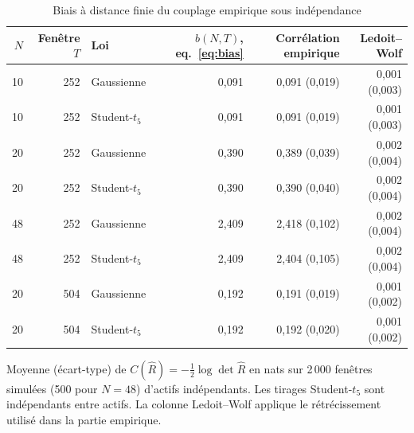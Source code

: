 \begin{table}[p]\centering\small
\caption{Biais à distance finie du couplage empirique sous indépendance}\label{tab:bias}
\begin{tabular}{@{}rrlrrr@{}}\toprule
$N$ & Fenêtre $T$ & Loi & $b(N,T)$, eq.~\eqref{eq:bias} & Corrélation empirique & Ledoit--Wolf \\\midrule
10 & 252 & Gaussienne & 0{,}091 & 0{,}091 (0{,}019) & 0{,}001 (0{,}003) \\
10 & 252 & Student-$t_5$ & 0{,}091 & 0{,}091 (0{,}019) & 0{,}001 (0{,}003) \\
20 & 252 & Gaussienne & 0{,}390 & 0{,}389 (0{,}039) & 0{,}002 (0{,}004) \\
20 & 252 & Student-$t_5$ & 0{,}390 & 0{,}390 (0{,}040) & 0{,}002 (0{,}004) \\
48 & 252 & Gaussienne & 2{,}409 & 2{,}418 (0{,}102) & 0{,}002 (0{,}004) \\
48 & 252 & Student-$t_5$ & 2{,}409 & 2{,}404 (0{,}105) & 0{,}002 (0{,}004) \\
20 & 504 & Gaussienne & 0{,}192 & 0{,}191 (0{,}019) & 0{,}001 (0{,}002) \\
20 & 504 & Student-$t_5$ & 0{,}192 & 0{,}192 (0{,}020) & 0{,}001 (0{,}002) \\
\bottomrule\end{tabular}
\par\medskip\begin{minipage}{0.95\linewidth}\footnotesize
Moyenne (écart-type) de $C(\hat R)=-\frac12\log\det\hat R$ en nats sur 2\,000 fenêtres simulées (500 pour $N=48$) d'actifs indépendants.
Les tirages Student-$t_5$ sont indépendants entre actifs. La colonne Ledoit--Wolf applique le rétrécissement utilisé dans la partie empirique.
\end{minipage}
\end{table}

